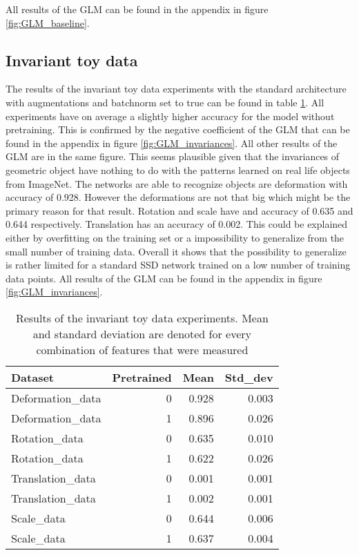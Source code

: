All results of the GLM can be found in the appendix in figure \ref{fig:GLM_baseline}. 


\subsection{Invariant toy data}

The results of the invariant toy data experiments with the standard architecture with augmentations and batchnorm set to true can be found in table \ref{table:invariant_data}. All experiments have on average a slightly higher accuracy for the model without pretraining. This is confirmed by the negative coefficient of the GLM that can be found in the appendix in figure \ref{fig:GLM_invariances}. All other results of the GLM are in the same figure.  This seems plausible given that the invariances of geometric object have nothing to do with the patterns learned on real life objects from ImageNet. The networks are able to recognize objects are deformation with accuracy of 0.928. However the deformations are not that big which might be the primary reason for that result. Rotation and scale have and accuracy of 0.635 and 0.644 respectively. Translation has an accuracy of 0.002. This could be explained either by overfitting on the training set or a impossibility to generalize from the small number of training data. Overall it shows that the possibility to generalize is rather limited for a standard SSD network trained on a low number of training data points. All results of the GLM can be found in the appendix in figure \ref{fig:GLM_invariances}. 

\begin{table}[!htb]
	\centering
	\caption{Results of the invariant toy data experiments. Mean and standard deviation are denoted for every combination of features that were measured}
	\begin{tabular}{lrrr}
		\toprule
		Dataset &  Pretrained &   Mean &  Std\_dev \\
		\midrule
		Deformation\_data &           0 &  0.928 &    0.003 \\
		Deformation\_data &           1 &  0.896 &    0.026 \\
		Rotation\_data &           0 &  0.635 &    0.010 \\
		Rotation\_data &           1 &  0.622 &    0.026 \\
		Translation\_data &           0 &  0.001 &    0.001 \\
		Translation\_data &           1 &  0.002 &    0.001 \\
		Scale\_data &           0 &  0.644 &    0.006 \\
		Scale\_data &           1 &  0.637 &    0.004 \\
		\bottomrule
	\end{tabular}
	\label{table:invariant_data}
\end{table}

